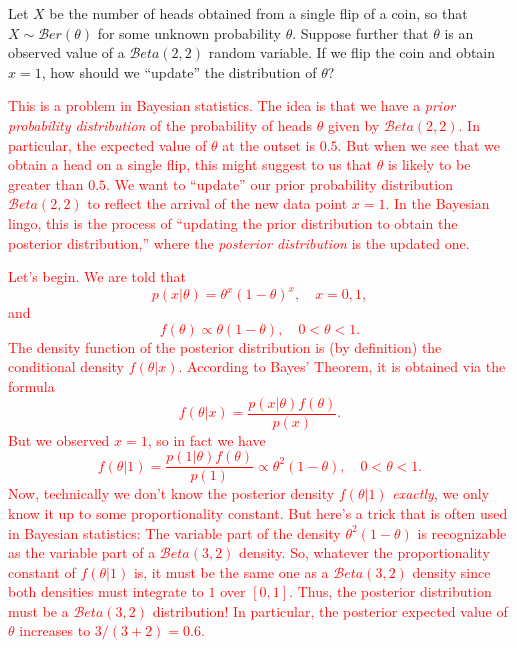 \documentclass[12pt,reqno]{amsart}
\begin{document}
\bigskip
\prob Let $X$ be the number of heads obtained from a single flip of a coin, so that $X\sim \mathcal{B}er(\theta)$ for some unknown probability $\theta$. Suppose further that $\theta$ is an observed value of a $\mathcal{B}eta(2,2)$ random variable. If we flip the coin and obtain $x=1$, how should we ``update'' the distribution of $\theta$?

\bigskip
\textcolor{red}{This is a problem in Bayesian statistics. The idea is that we have a \textit{prior probability distribution} of the probability of heads $\theta$ given by $\mathcal{B}eta(2,2)$. In particular, the expected value of $\theta$ at the outset is $0.5$. But when we see that we obtain a head on a single flip, this might suggest to us that $\theta$ is likely to be greater than $0.5$. We want to ``update'' our prior probability distribution $\mathcal{B}eta(2,2)$ to reflect the arrival of the new data point $x=1$. In the Bayesian lingo, this is the process of ``updating the prior distribution to obtain the posterior distribution,'' where the \textit{posterior distribution} is the updated one.}

\bigskip
\textcolor{red}{Let's begin. We are told that
	\[p(x|\theta) = \theta^x (1-\theta)^x, \quad x=0,1,
	\]
and
	\[f(\theta) \propto \theta(1-\theta), \quad 0 < \theta < 1.
	\]
The density function of the posterior distribution is (by definition) the conditional density $f(\theta|x)$. According to Bayes' Theorem, it is obtained via the formula
	\[f(\theta|x) = \frac{p(x|\theta)f(\theta)}{p(x)}.
	\]
But we observed $x=1$, so in fact we have
	\[f(\theta|1) = \frac{p(1|\theta)f(\theta)}{p(1)} \propto \theta^2 ( 1-\theta), \quad 0 < \theta < 1.
	\]
Now, technically we don't know the posterior density $f(\theta|1)$ \textit{exactly}, we only know it up to some proportionality constant. But here's a trick that is often used in Bayesian statistics: The variable part of the density $\theta^2(1-\theta)$ is recognizable as the variable part of a $\mathcal{B}eta(3,2)$ density. So, whatever the proportionality constant of $f(\theta|1)$ is, it must be the same one as a $\mathcal{B}eta(3,2)$ density since both densities must integrate to $1$ over $[0,1]$. Thus, the posterior distribution must be a $\mathcal{B}eta(3,2)$ distribution! In particular, the posterior expected value of $\theta$ increases to $3/(3+2) = 0.6$.}
\end{document}
